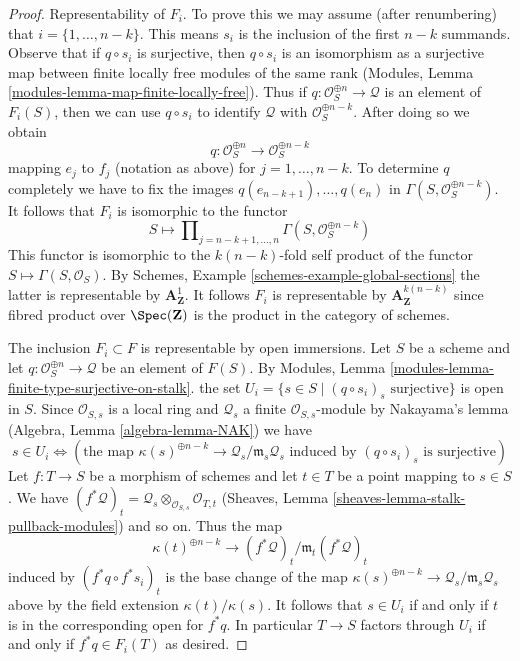 \begin{proof}
\medskip\noindent
Representability of $F_i$. To prove this we may assume (after renumbering)
that $i = \{1, \ldots, n - k\}$. This means $s_i$ is the inclusion of
the first $n - k$ summands. Observe that if $q \circ s_i$ is surjective,
then $q \circ s_i$ is an isomorphism as a surjective map between finite
locally free modules of the same rank
(Modules, Lemma \ref{modules-lemma-map-finite-locally-free}).
Thus if $q : \mathcal{O}_S^{\oplus n} \to \mathcal{Q}$ is an element of
$F_i(S)$, then we can use $q \circ s_i$ to identify $\mathcal{Q}$ with
$\mathcal{O}_S^{\oplus n - k}$. After doing so we obtain
$$
q : \mathcal{O}_S^{\oplus n} \longrightarrow \mathcal{O}_S^{\oplus n - k}
$$
mapping $e_j$ to $f_j$ (notation as above) for $j = 1, \ldots, n - k$.
To determine $q$ completely we have to fix the images
$q(e_{n - k + 1}), \ldots, q(e_n)$ in
$\Gamma(S, \mathcal{O}_S^{\oplus n - k})$.
It follows that $F_i$ is isomorphic to the functor
$$
S \longmapsto
\prod\nolimits_{j = n - k + 1, \ldots, n}
\Gamma(S,  \mathcal{O}_S^{\oplus n - k})
$$
This functor is isomorphic to the $k(n - k)$-fold self product of the functor
$S \mapsto \Gamma(S, \mathcal{O}_S)$. By
Schemes, Example \ref{schemes-example-global-sections}
the latter is representable by $\mathbf{A}^1_\mathbf{Z}$. It follows $F_i$
is representable by $\mathbf{A}^{k(n - k)}_\mathbf{Z}$ since fibred product
over $\Spec(\mathbf{Z})$ is the product in the category of schemes.

\medskip\noindent
The inclusion $F_i \subset F$ is representable by open immersions.
Let $S$ be a scheme and let
$q : \mathcal{O}_S^{\oplus n} \to \mathcal{Q}$ be an element of
$F(S)$. By
Modules, Lemma \ref{modules-lemma-finite-type-surjective-on-stalk}.
the set $U_i = \{s \in S \mid (q \circ s_i)_s\text{ surjective}\}$
is open in $S$. Since $\mathcal{O}_{S, s}$ is a local ring
and $\mathcal{Q}_s$ a finite $\mathcal{O}_{S, s}$-module
by Nakayama's lemma (Algebra, Lemma \ref{algebra-lemma-NAK}) we have
$$
s \in U_i \Leftrightarrow
\left(
\text{the map }
\kappa(s)^{\oplus n - k} \to \mathcal{Q}_s/\mathfrak m_s\mathcal{Q}_s
\text{ induced by }
(q \circ s_i)_s
\text{ is surjective}
\right)
$$
Let $f : T \to S$ be a morphism of schemes and let $t \in T$ be a point
mapping to $s \in S$. We have
$(f^*\mathcal{Q})_t =
\mathcal{Q}_s \otimes_{\mathcal{O}_{S, s}} \mathcal{O}_{T, t}$
(Sheaves, Lemma \ref{sheaves-lemma-stalk-pullback-modules})
and so on. Thus the map
$$
\kappa(t)^{\oplus n - k} \to (f^*\mathcal{Q})_t/\mathfrak m_t(f^*\mathcal{Q})_t
$$
induced by $(f^*q \circ f^*s_i)_t$ is the base change of the map
$\kappa(s)^{\oplus n - k} \to \mathcal{Q}_s/\mathfrak m_s\mathcal{Q}_s$
above by the field extension $\kappa(t)/\kappa(s)$. It follows
that $s \in U_i$ if and only if $t$ is in the corresponding open
for $f^*q$. In particular $T \to S$ factors through $U_i$ if
and only if $f^*q \in F_i(T)$ as desired.


\end{proof}

